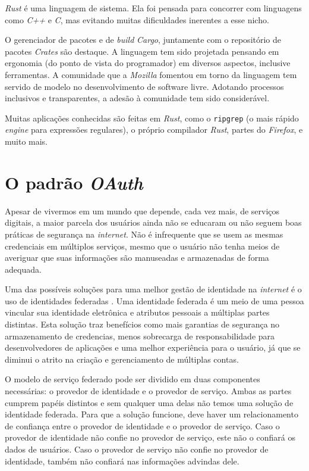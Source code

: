 \emph{Rust} é uma linguagem de sistema. Ela foi pensada para concorrer
com linguagens como \emph{C++} e \emph{C}, mas evitando muitas dificuldades
inerentes a esse nicho.

O gerenciador de pacotes e de \emph{build} \emph{Cargo}, juntamente com o
repositório de pacotes \emph{Crates} são destaque. 
A linguagem tem sido projetada pensando em ergonomia (do ponto de vista
do programador) em diversos aspectos, inclusive ferramentas.
A comunidade que a \emph{Mozilla} fomentou em torno da linguagem tem servido
de modelo no desenvolvimento de software livre.
Adotando processos inclusivos e transparentes, a adesão à comunidade
tem sido considerável.

Muitas aplicações conhecidas são feitas em \emph{Rust}, como o
\texttt{ripgrep} (o mais rápido \emph{engine} para expressões regulares),
o próprio compilador \emph{Rust}, partes do \emph{Firefox}, e muito mais.

  \section{O padrão \emph{OAuth}}
  Apesar de vivermos em um mundo que depende, cada vez mais, de serviços digitais,
  a maior parcela dos usuários ainda não se educaram ou 
  não seguem boas práticas de segurança na \emph{internet}. Não é infrequente que se 
  usem as mesmas credenciais em múltiplos serviços, mesmo que o usuário 
  não tenha meios de averiguar que suas informações são manuseadas e armazenadas de forma 
  adequada.

  Uma das possíveis soluções para uma melhor gestão de identidade na \emph{internet} 
  é o uso de identidades federadas \cite{208723}. Uma identidade federada é um meio 
  de uma pessoa vincular sua identidade eletrônica e atributos pessoais 
  a múltiplas partes distintas. Esta solução traz benefícios como mais garantias
  de segurança no armazenamento de credencias, menos sobrecarga de responsabilidade 
  para desenvolvedores de aplicações e uma melhor experiência para o usuário, já que se 
  diminui o atrito na criação e gerenciamento de múltiplas contas.

  O modelo de serviço federado pode ser dividido em duas componentes necessárias: 
  o provedor de identidade e o provedor de serviço. Ambas as partes cumprem papéis 
  distintos e sem qualquer uma delas não temos uma solução de identidade federada. 
  Para que a solução funcione, deve haver um relacionamento de confiança entre 
  o provedor de identidade e o provedor de serviço. Caso o provedor de identidade 
  não confie no provedor de serviço, este não o confiará os dados de usuários.
  Caso o provedor de serviço não confie no provedor de identidade, 
  também não confiará nas informações advindas dele.

